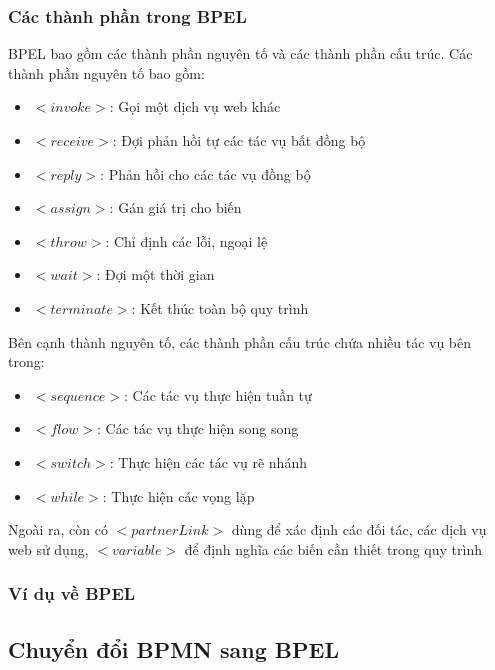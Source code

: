 \subsubsection{Các thành phần trong BPEL}
BPEL bao gồm các thành phần nguyên tố và các thành phần cấu trúc. Các thành phần nguyên tố bao gồm:
\begin{itemize}
	\item $<invoke>$: Gọi một dịch vụ web khác
	\item $<receive>$: Đợi phản hồi tự các tác vụ bất đồng bộ
	\item $<reply>$: Phản hồi cho các tác vụ đồng bộ
	\item $<assign>$: Gán giá trị cho biến
	\item $<throw>$: Chỉ định các lỗi, ngoại lệ
	\item $<wait>$: Đợi một thời gian
	\item $<terminate>$: Kết thúc toàn bộ quy trình
\end{itemize}

Bên cạnh thành nguyên tố, các thành phần cấu trúc chứa nhiều tác vụ bên trong:
\begin{itemize}
	\item $<sequence>$: Các tác vụ thực hiện tuần tự
	\item $<flow>$: Các tác vụ thực hiện song song
	\item $<switch>$: Thực hiện các tác vụ rẽ nhánh
	\item $<while>$: Thực hiện các vọng lặp
\end{itemize}

Ngoài ra, còn có $<partnerLink>$ dùng để xác định các đối tác, các dịch vụ web sử dụng, $<variable>$ để định nghĩa các biến cần thiết trong quy trình

\subsubsection{Ví dụ về BPEL}


\subsection{Chuyển đổi BPMN sang BPEL}